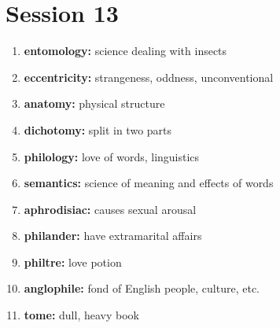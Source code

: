 \documentclass{article}
\begin{document}
\section{Session 13}
\begin{enumerate}
    \item \textbf{entomology: }{science dealing with insects}
    \item \textbf{eccentricity: }{strangeness, oddness, unconventional}
    \item \textbf{anatomy: }{physical structure}
    \item \textbf{dichotomy: }{split in two parts}
    \item \textbf{philology: }{love of words, linguistics}
    \item \textbf{semantics: }{science of meaning and effects of words}
    \item \textbf{aphrodisiac: }{causes sexual arousal}
    \item \textbf{philander: }{have extramarital affairs}
    \item \textbf{philtre: }{love potion}
    \item \textbf{anglophile: }{fond of English people, culture, etc.}
    \item \textbf{tome: }{dull, heavy book}
    
\end{enumerate}
\end{document}

